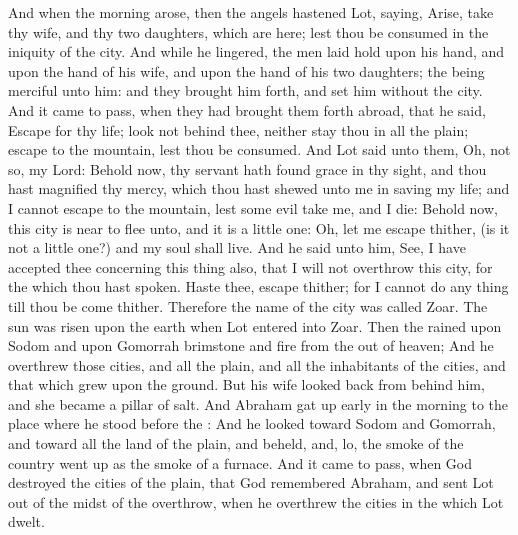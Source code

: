 \begin{biblechapter}
\verse And when the morning arose, then the angels hastened Lot, saying, Arise, take thy wife, and thy two daughters, which are here; lest thou be consumed in the iniquity of the city.
\verse And while he lingered, the men laid hold upon his hand, and upon the hand of his wife, and upon the hand of his two daughters; the \LORD being merciful unto him: and they brought him forth, and set him without the city.
\verse And it came to pass, when they had brought them forth abroad, that he said, Escape for thy life; look not behind thee, neither stay thou in all the plain; escape to the mountain, lest thou be consumed.
\verse And Lot said unto them, Oh, not so, my Lord:
\verse Behold now, thy servant hath found grace in thy sight, and thou hast magnified thy mercy, which thou hast shewed unto me in saving my life; and I cannot escape to the mountain, lest some evil take me, and I die:
\verse Behold now, this city is near to flee unto, and it is a little one: Oh, let me escape thither, (is it not a little one?) and my soul shall live.
\verse And he said unto him, See, I have accepted thee concerning this thing also, that I will not overthrow this city, for the which thou hast spoken.
\verse Haste thee, escape thither; for I cannot do any thing till thou be come thither. Therefore the name of the city was called Zoar.
\verse The sun was risen upon the earth when Lot entered into Zoar.
\verse Then the \LORD rained upon Sodom and upon Gomorrah brimstone and fire from the \LORD out of heaven;
\verse And he overthrew those cities, and all the plain, and all the inhabitants of the cities, and that which grew upon the ground.
\verse But his wife looked back from behind him, and she became a pillar of salt.
\verse And Abraham gat up early in the morning to the place where he stood before the \LORD:
\verse And he looked toward Sodom and Gomorrah, and toward all the land of the plain, and beheld, and, lo, the smoke of the country went up as the smoke of a furnace.
\verse And it came to pass, when God destroyed the cities of the plain, that God remembered Abraham, and sent Lot out of the midst of the overthrow, when he overthrew the cities in the which Lot dwelt.

\end{biblechapter}
